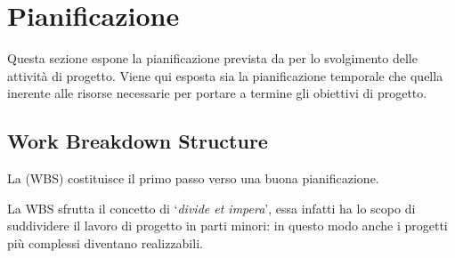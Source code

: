


\section{Pianificazione}
Questa sezione espone la pianificazione prevista da \team per lo svolgimento delle attività di progetto. Viene qui esposta sia la pianificazione temporale che quella inerente alle risorse necessarie per portare a termine gli obiettivi di progetto.

\subsection{Work Breakdown Structure}

La  (WBS) costituisce il primo passo verso una buona pianificazione.

La WBS sfrutta il concetto di `\textit{divide et impera}', essa infatti ha lo scopo di suddividere il lavoro di progetto in parti minori: in questo modo anche i progetti più complessi diventano realizzabili.

